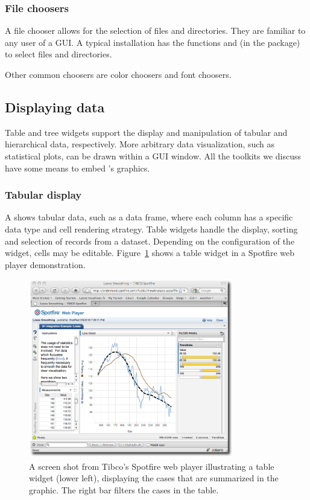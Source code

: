 \subsubsection{File choosers}
\label{sec:GUI:file-choosers}

A file chooser allows for the selection of files and directories. They
are familiar to any user of a GUI. A typical \R\/ installation has the
functions  and  (in
the  package) to select files and directories.

Other common choosers are color choosers and font choosers.

\subsection{Displaying data}
\label{sec:GUI:tabular-display}

Table and tree widgets support the display and manipulation of tabular
and hierarchical data, respectively. More arbitrary data
visualization, such as statistical plots, can be drawn within a GUI
window. All the toolkits we discuss have some means to embed \R's graphics.


\subsubsection{Tabular display}

A  shows tabular data, such as a data frame, where
each column has a specific data type and cell rendering strategy.
Table widgets handle the display, sorting and selection of records
from a dataset. Depending on the configuration of the widget, cells
may be editable.  Figure~\ref{fig:GUI:spotfire} shows a table widget
in a Spotfire web player demonstration. 

\begin{figure}
  \centering
  \includegraphics[width=0.8\textwidth]{fig-spotfire}
  \caption{A screen shot from Tibco's Spotfire web player illustrating
    a table widget (lower left), displaying the cases that are
    summarized in the graphic. The right bar filters the cases in the table. }
  \label{fig:GUI:spotfire}
\end{figure}


